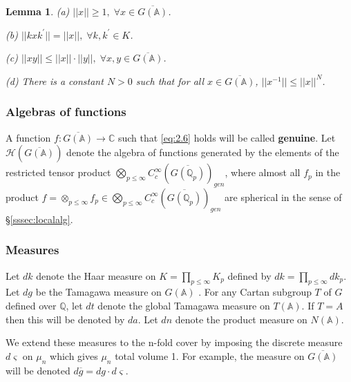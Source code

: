 \documentclass[12pt]{article}
\numberwithin{equation}{section}
\newtheorem{lemma}[theorem]{Lemma}
\def\aaa{\mathbb{A}}
\def\qqq{\mathbb{Q}}
\def\ccc{\mathbb{C}}
\begin{document}
\begin{lemma}\label{lem:2.9}
(a) $||x||\geq 1,\;\forall x\in \overline{G(\aaa )}$.

(b) $||kxk^{\prime }||=||x||,\;\forall k,k^{\prime }\in K$.

(c) $||xy||\leq ||x||\cdot ||y||,\;\forall x,y\in \overline{G(\aaa )}$.

(d) There is a constant $N>0$ such that for all
$x\in \overline{G(\aaa )}$,
$||x^{-1}||\leq ||x||^N$.
\end{lemma}

\subsubsection{Algebras of functions}

A function $f:\overline{G(\aaa )}\rightarrow \ccc $
such that \eqref{eq:2.6}
holds will be called {\bf genuine}. Let 
${\mathcal{H}}(\overline{G(\aaa )})$ denote the algebra of 
functions generated by the elements of the
restricted tensor product 
$\bigotimes_{p\leq \infty }
C_c^\infty (\overline{G(\qqq_p)})_{gen}$, 
where almost all $f_p$ in the product 
$f=\otimes _{p\leq \infty}f_p\in 
\bigotimes_{p\leq \infty }C_c^\infty (\overline{G(\qqq_p)})_{gen}$ are
spherical in the sense of \S\ref{sssec:localalg}.

\subsubsection{Measures}

Let $dk$ denote the Haar measure on $K=\prod_{p\leq \infty }K_p$
defined by $dk=\prod_{p\leq \infty }dk_p$.
Let $dg$ be the Tamagawa measure on
$G(\aaa )$ \cite{W2}. For any Cartan subgroup
$T$ of $G$ defined over $\qqq$, let $dt$
denote the global Tamagawa measure on $T(\aaa )$. If $T=A$ then this will
be denoted by $da$. Let $dn$ denote the product measure on $N(\aaa )$.

We extend these measures to the n-fold cover by imposing the discrete
measure $d\varsigma $ on $\mu _n$ which gives $\mu _n$ total volume 1. For
example, the measure on $\overline{G(\aaa )}$ will be denoted
$d\overline{g}=dg\cdot d\varsigma $.









\end{document}
